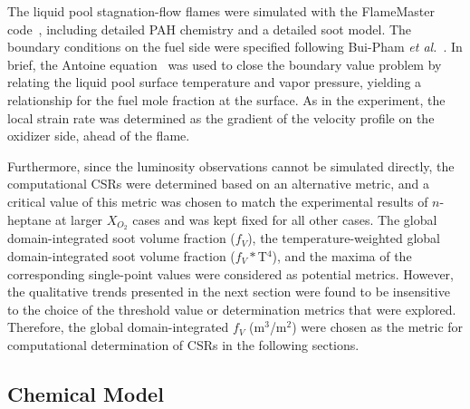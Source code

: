 The liquid pool stagnation-flow flames were simulated with the FlameMaster code~\cite{flamemaster}, including detailed PAH chemistry and a detailed soot model. The boundary conditions on the fuel side were specified following Bui-Pham \emph{et al.}~\cite{buipham91}. In brief, the Antoine equation~\cite{polingbook} was used to close the boundary value problem by relating the liquid pool surface temperature and vapor pressure, yielding a relationship for the fuel mole fraction at the surface. As in the experiment, the local strain rate was determined as the gradient of the velocity profile on the oxidizer side, ahead of the flame. 

Furthermore, since the luminosity observations cannot be simulated directly, the computational CSRs were determined based on an alternative metric, and a critical value of this metric was chosen to match the experimental results of $n$-heptane at larger $X_{O_2}$ cases and was kept fixed for all other cases.  The global domain-integrated soot volume fraction ($f_V$), the temperature-weighted global domain-integrated soot volume fraction ($f_V*$T$^4$), and the maxima of the corresponding single-point values were considered as potential metrics.  However, the qualitative trends presented in the next section were found to be insensitive to the choice of the threshold value or determination metrics that were explored.  Therefore, the global domain-integrated $f_V$ (m$^3$/m$^2$) were chosen as the metric for computational determination of CSRs in the following sections.

\subsection{Chemical Model} 

